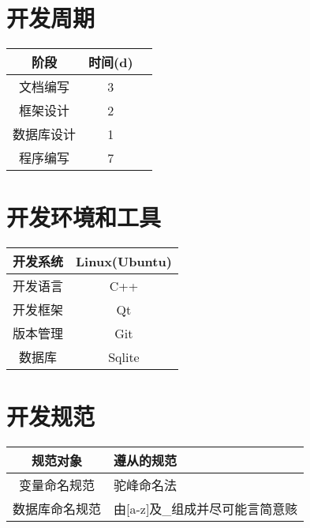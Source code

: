 \section{开发周期}
	\begin{tabular}{|c|c|c|}
	    \hline
	    阶段 & 时间(d)  \\
	    \hline
	    文档编写 & 3 \\
	    \hline
	    框架设计 & 2 \\
	    \hline
	    数据库设计 & 1 \\
	    \hline
	    程序编写 & 7 \\
	    \hline
	\end{tabular}
\section{开发环境和工具}
	\begin{tabular}{|c|c|}
	    \hline
	    开发系统 & Linux(Ubuntu) \\
	    \hline
	    开发语言 & C++ \\
	    \hline
	    开发框架 & Qt \\
	    \hline
	    版本管理 & Git \\
	    \hline
	    数据库 & Sqlite \\
	    \hline
	\end{tabular}
\section{开发规范}
	\begin{tabular}{|c|p{3cm}|}
	    \hline
	    规范对象 & 遵从的规范 \\
	    \hline 
	    变量命名规范 & 驼峰命名法 \\
	    \hline
	    数据库命名规范 & 由[a-z]及\_组成并尽可能言简意赅 \\
	    \hline
	\end{tabular}